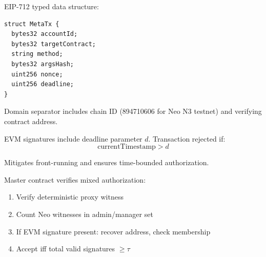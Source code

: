 \documentclass[10pt,twocolumn]{article}
\begin{document}
EIP-712 typed data structure:
\begin{verbatim}
struct MetaTx {
  bytes32 accountId;
  bytes32 targetContract;
  string method;
  bytes32 argsHash;
  uint256 nonce;
  uint256 deadline;
}
\end{verbatim}

Domain separator includes chain ID (894710606 for Neo N3 testnet) and verifying contract address.


EVM signatures include deadline parameter $d$. Transaction rejected if:
$$\text{currentTimestamp} > d$$

Mitigates front-running and ensures time-bounded authorization.


Master contract verifies mixed authorization:
\begin{enumerate}[leftmargin=*,topsep=2pt,itemsep=1pt]
\item Verify deterministic proxy witness
\item Count Neo witnesses in admin/manager set
\item If EVM signature present: recover address, check membership
\item Accept iff total valid signatures $\geq \tau$
\end{enumerate}
\end{document}
